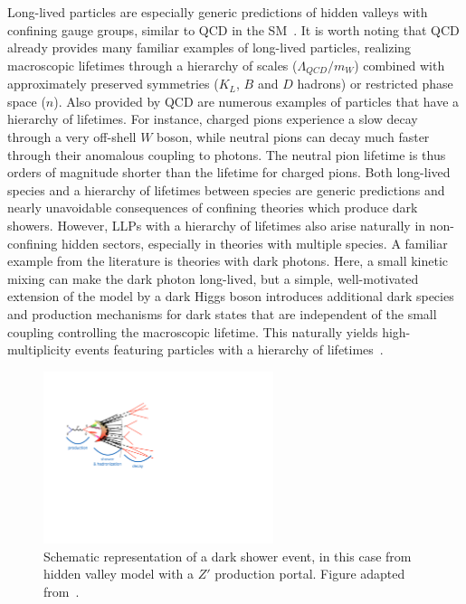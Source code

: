 Long-lived particles are especially generic predictions of hidden valleys with confining gauge groups, similar to QCD in the SM~\cite{Strassler:2006im}. It is worth noting that QCD already provides many familiar examples of long-lived particles, realizing macroscopic lifetimes through a hierarchy of scales ($\Lambda_{QCD}/m_W$) combined with approximately preserved symmetries ($K_L$, $B$ and $D$ hadrons) or restricted phase space ($n$). Also provided by QCD are numerous examples of particles that have a hierarchy of lifetimes. For instance, charged pions experience a slow decay through a very off-shell $W$ boson, while neutral pions can decay much faster through their anomalous coupling to photons. The neutral pion lifetime is thus orders of magnitude shorter than the lifetime for charged pions. Both long-lived species and a hierarchy of lifetimes between species are generic predictions and nearly unavoidable consequences of confining theories which produce dark showers. However, LLPs with a hierarchy of lifetimes also arise naturally in non-confining hidden sectors, especially in theories with multiple species. A familiar example from the literature is theories with dark photons. Here, a small kinetic mixing can make the dark photon long-lived, but a simple, well-motivated extension of the model by a dark Higgs boson introduces additional dark species and production mechanisms for dark states that are independent of the small coupling controlling the macroscopic lifetime. This naturally yields high-multiplicity events featuring particles with a hierarchy of lifetimes~\cite{Schabinger:2005ei,Chan:2011aa,Curtin:2014cca}.

\begin{figure}[t]\centering
\includegraphics[width=0.6\textwidth]{figures/DS_diagram}
\caption{Schematic representation of a dark shower event, in this case from hidden valley model with a $Z'$ production portal. Figure adapted from~\cite{Strassler:2008fv}.\label{fig:showerdiagram}}
\end{figure}


